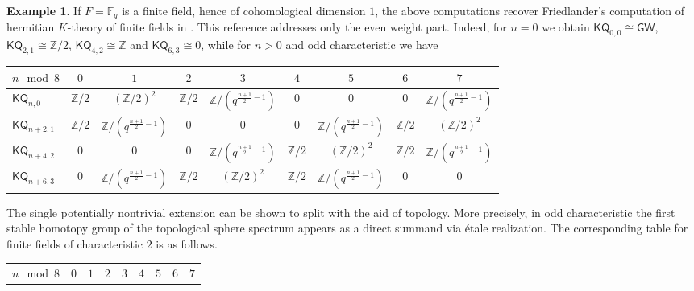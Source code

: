 \documentclass[11pt,hyp,english]{article}
\newcommand{\Z}{\mathbb{Z}}
\newcommand{\KQ}{\mathsf{KQ}}
\newcommand{\GW}{\mathsf{GW}}
\newcommand{\C}{\mathbb{C}}
\let\iso=\cong
\theoremstyle{definition}
\newtheorem{example}[theorem]{Example}
\begin{document}

\begin{example}\label{ex:kq-finite-fields}
If $F=\mathbb{F}_q$ is a finite field, hence of cohomological dimension $1$, the above computations recover Friedlander's computation of hermitian $K$-theory of finite fields in \cite{Friedlander-Fq}.
This reference addresses only the even weight part. 
Indeed, for $n=0$ we obtain $\KQ_{0,0}\cong\GW$, $\KQ_{2,1}\iso \Z/2$, $\KQ_{4,2}\cong \Z$ and $\KQ_{6,3}\iso 0$, while for $n>0$ and odd characteristic we have
\begin{center}
\begin{tabularx}{\textwidth}{l | c c c c c c c c}
\toprule
$n\mod 8$ & $0$ & $1$ & $2$ & $3$ & $4$ & $5$ & $6$ & $7$\\
\midrule
$\KQ_{n,0}$ & $\Z/2$ & $(\Z/2)^2$ & $\Z/2$ &  $\Z/(q^{\frac{n+1}{2}-1})$ & 0 & 0 & 0 & $\Z/(q^{\frac{n+1}{2}-1})$\\
$\KQ_{n+2,1}$ & $\Z/2$ & $\Z/(q^{\frac{n+1}{2}-1})$ & 0 & 0 & 0 & $\Z/(q^{\frac{n+1}{2}-1})$ & $\Z/2$ & $(\Z/2)^2$\\
$\KQ_{n+4,2}$ & $0$ & $0$ & $0$ &  $\Z/(q^{\frac{n+1}{2}-1})$ & $\Z/2$ & $(\Z/2)^2$ & $\Z/2$ & $\Z/(q^{\frac{n+1}{2}-1})$\\
$\KQ_{n+6,3}$ & $0$ &  $\Z/(q^{\frac{n+1}{2}-1})$ & $\Z/2$ & $(\Z/2)^2$ & $\Z/2$ & $\Z/(q^{\frac{n+1}{2}-1})$& $0$ & $0$ \\
\bottomrule
\end{tabularx}
\end{center}
The single potentially nontrivial extension can be shown to split with the aid of topology. More precisely, in odd characteristic the first stable homotopy group of the topological sphere spectrum appears as a direct summand via étale realization. The corresponding table for finite fields of characteristic $2$ is as follows.
\begin{center}
\begin{tabularx}{\textwidth}{l| c c c c c c c c}
\toprule
$n\mod8$ & $0$ & $1$ & $2$ & $3$ & $4$ & $5$ & $6$ & $7$\\

\end{tabularx}
\end{center}
\end{example}
\end{document}
